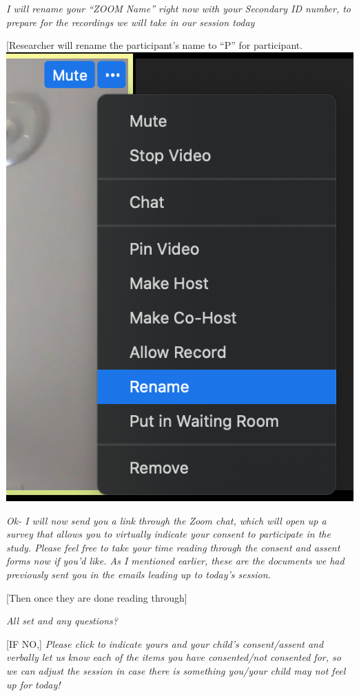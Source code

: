 \documentclass[]{book}
\begin{document}
\emph{I will rename your ``ZOOM Name'' right now with your Secondary ID number, to prepare for the recordings we will take in our session today}

{[}Researcher will rename the participant's name to ``P'' for participant. \includegraphics{images/zoom_parent_child_interaction/1.png}

\emph{Ok- I will now send you a link through the Zoom chat, which will open up a survey that allows you to virtually indicate your consent to participate in the study. Please feel free to take your time reading through the consent and assent forms now if you'd like. As I mentioned earlier, these are the documents we had previously sent you in the emails leading up to today's session.}

{[}Then once they are done reading through{]}

\emph{All set and any questions?}

{[}IF NO,{]} \emph{Please click to indicate yours and your child's consent/assent and verbally let us know each of the items you have consented/not consented for, so we can adjust the session in case there is something you/your child may not feel up for today!}
\end{document}

